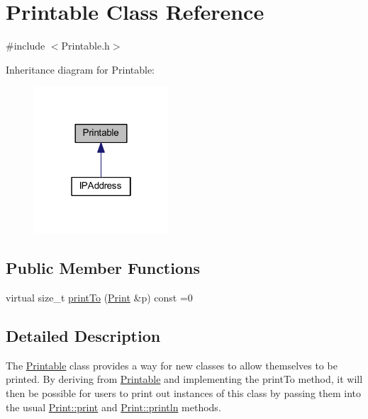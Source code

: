 \hypertarget{class_printable}{}\section{Printable Class Reference}
\label{class_printable}


{\ttfamily \#include $<$Printable.\+h$>$}



Inheritance diagram for Printable\+:
\nopagebreak
\begin{figure}[H]
\begin{center}
\leavevmode
\includegraphics[width=142pt]{class_printable__inherit__graph}
\end{center}
\end{figure}
\subsection*{Public Member Functions}
\begin{DoxyCompactItemize}
\item 
virtual size\+\_\+t \hyperlink{class_printable_a95c9f86bb3e38a8743433c80c9250664}{print\+To} (\hyperlink{class_print}{Print} \&p) const  =0
\end{DoxyCompactItemize}


\subsection{Detailed Description}
The \hyperlink{class_printable}{Printable} class provides a way for new classes to allow themselves to be printed. By deriving from \hyperlink{class_printable}{Printable} and implementing the print\+To method, it will then be possible for users to print out instances of this class by passing them into the usual \hyperlink{class_print_a443a13ae44e1a8930db53fc5161554f9}{Print\+::print} and \hyperlink{class_print_a36d02f29121121bca22cd51d468dfa9e}{Print\+::println} methods. 

